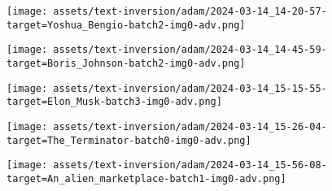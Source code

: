 \begin{figure*}[]
\begin{minipage}[t]{.025\textwidth}
     \vspace{0pt}
\end{minipage}%
\hspace{1ex}
\begin{minipage}[t]{0.98\figwidth}
    \vspace{0pt}
    \begin{subfigure}[t]{0.2\textwidth}
        \texttt{[image: assets/text-inversion/adam/2024-03-14\_14-20-57-target=Yoshua\_Bengio-batch2-img0-adv.png]}
    \end{subfigure}%
    \begin{subfigure}[t]{0.2\textwidth}
        \texttt{[image: assets/text-inversion/adam/2024-03-14\_14-45-59-target=Boris\_Johnson-batch2-img0-adv.png]}
    \end{subfigure}%
    \begin{subfigure}[t]{0.2\textwidth}
        \texttt{[image: assets/text-inversion/adam/2024-03-14\_15-15-55-target=Elon\_Musk-batch3-img0-adv.png]}
    \end{subfigure}%
    \begin{subfigure}[t]{0.2\textwidth}
        \texttt{[image: assets/text-inversion/adam/2024-03-14\_15-26-04-target=The\_Terminator-batch0-img0-adv.png]}
    \end{subfigure}%
    \begin{subfigure}[t]{0.2\textwidth}
        \texttt{[image: assets/text-inversion/adam/2024-03-14\_15-56-08-target=An\_alien\_marketplace-batch1-img0-adv.png]}
    \end{subfigure}%
\end{minipage}


\end{figure*}
